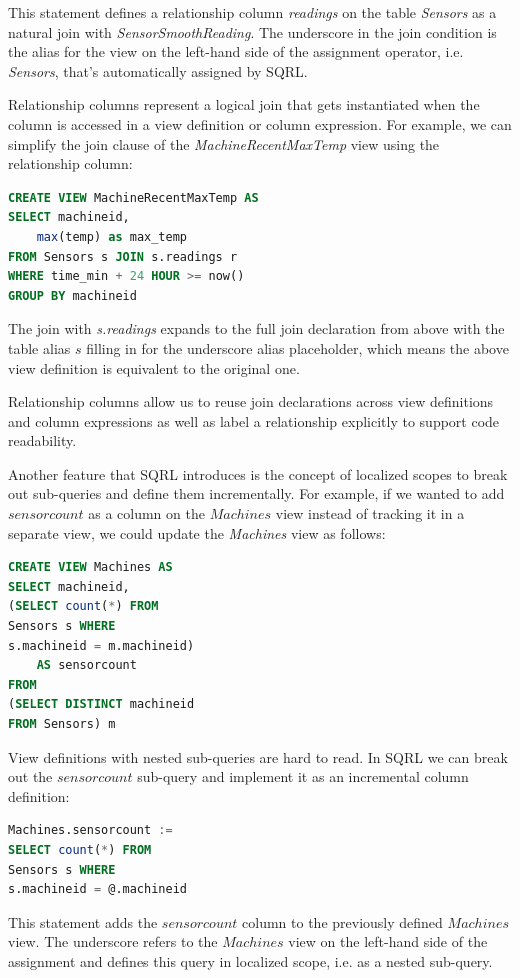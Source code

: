 \documentclass[	DIV=calc,%
							paper=letter,%
							fontsize=11pt,%
							twocolumn]{scrartcl}	 					%
\begin{document}
This statement defines a relationship column \emph{readings} on the table \emph{Sensors} as a natural join with \emph{SensorSmoothReading}.
The underscore in the join condition is the alias for the view on the left-hand side of the assignment operator, i.e. \emph{Sensors}, that's automatically assigned by SQRL.

Relationship columns represent a logical join that gets instantiated when the column is accessed in a view definition or column expression. For example, we can simplify the join clause of the \emph{MachineRecentMaxTemp} view using the relationship column:
\begin{lstlisting}[language=SQL]
CREATE VIEW MachineRecentMaxTemp AS
SELECT machineid,
    max(temp) as max_temp
FROM Sensors s JOIN s.readings r
WHERE time_min + 24 HOUR >= now()
GROUP BY machineid
\end{lstlisting}

The join with \emph{s.readings} expands to the full join declaration from above with the table alias $s$ filling in for the underscore alias placeholder, which means the above view definition is equivalent to the original one.

Relationship columns allow us to reuse join declarations across view definitions and column expressions as well as label a relationship explicitly to support code readability.

Another feature that SQRL introduces is the concept of localized scopes to break out sub-queries and define them incrementally. For example, if we wanted to add $sensorcount$ as a column on the $Machines$ view instead of tracking it in a separate view, we could update the \emph{Machines} view as follows:

\begin{lstlisting}[language=SQL]
CREATE VIEW Machines AS
SELECT machineid,
(SELECT count(*) FROM
Sensors s WHERE
s.machineid = m.machineid)
    AS sensorcount
FROM
(SELECT DISTINCT machineid
FROM Sensors) m
\end{lstlisting}

View definitions with nested sub-queries are hard to read. In SQRL we can break out the $sensorcount$ sub-query and implement it as an incremental column definition:
\begin{lstlisting}[language=SQL]
Machines.sensorcount :=
SELECT count(*) FROM
Sensors s WHERE
s.machineid = @.machineid
\end{lstlisting}

This statement adds the $sensorcount$ column to the previously defined $Machines$ view. The underscore refers to the $Machines$ view on the left-hand side of the assignment and defines this query in localized scope, i.e. as a nested sub-query.
\end{document}
